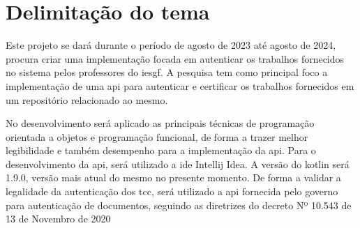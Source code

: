 \section{Delimitação do tema}

Este projeto se dará durante o período de agosto de 2023 até agosto de 2024, procura criar uma implementação focada em autenticar os trabalhos fornecidos no sistema pelos professores do \acrfull{iesgf}. 
A pesquisa tem como principal foco a implementação de uma \acrfull{api} para autenticar e certificar os trabalhos fornecidos em um repositório relacionado ao mesmo. 

No desenvolvimento será aplicado as principais técnicas de programação orientada a objetos e programação funcional, de forma a trazer melhor legibilidade e também desempenho para a implementação da \acrshort{api}.
Para o desenvolvimento da \acrshort{api}, será utilizado a \acrfull{ide} Intellij Idea. A versão do \acrshort{kotlin} será 1.9.0, versão mais atual do mesmo no presente momento. De forma a validar a legalidade da autenticação dos \acrlong{tcc}, será utilizado a \acrshort{api} fornecida pelo governo para autenticação de documentos, seguindo as diretrizes do decreto Nº 10.543 de 13 de Novembro de 2020 \cite{decreto112020}

